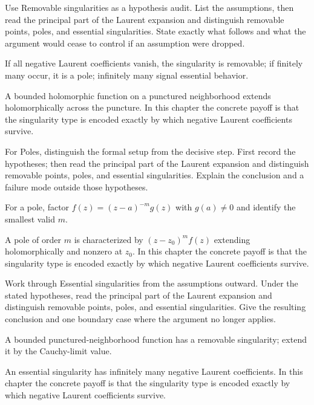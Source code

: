 \begin{exercise}\label{exr:iv09-01}
Use Removable singularities as a hypothesis audit. List the assumptions, then read the principal part of the Laurent expansion and distinguish removable points, poles, and essential singularities. State exactly what follows and what the argument would cease to control if an assumption were dropped.
\end{exercise}
\begin{hint}
If all negative Laurent coefficients vanish, the singularity is removable; if finitely many occur, it is a pole; infinitely many signal essential behavior.
\end{hint}
\begin{solution}
A bounded holomorphic function on a punctured neighborhood extends holomorphically across the puncture. In this chapter the concrete payoff is that the singularity type is encoded exactly by which negative Laurent coefficients survive.
\end{solution}

\begin{exercise}\label{exr:iv09-02}
For Poles, distinguish the formal setup from the decisive step. First record the hypotheses; then read the principal part of the Laurent expansion and distinguish removable points, poles, and essential singularities. Explain the conclusion and a failure mode outside those hypotheses.
\end{exercise}
\begin{hint}
For a pole, factor \(f(z)=(z-a)^{-m}g(z)\) with \(g(a)\ne0\) and identify the smallest valid \(m\).
\end{hint}
\begin{solution}
A pole of order $m$ is characterized by $(z-z_0)^mf(z)$ extending holomorphically and nonzero at $z_0$. In this chapter the concrete payoff is that the singularity type is encoded exactly by which negative Laurent coefficients survive.
\end{solution}

\begin{exercise}\label{exr:iv09-03}
Work through Essential singularities from the assumptions outward. Under the stated hypotheses, read the principal part of the Laurent expansion and distinguish removable points, poles, and essential singularities. Give the resulting conclusion and one boundary case where the argument no longer applies.
\end{exercise}
\begin{hint}
A bounded punctured-neighborhood function has a removable singularity; extend it by the Cauchy-limit value.
\end{hint}
\begin{solution}
An essential singularity has infinitely many negative Laurent coefficients. In this chapter the concrete payoff is that the singularity type is encoded exactly by which negative Laurent coefficients survive.
\end{solution}

